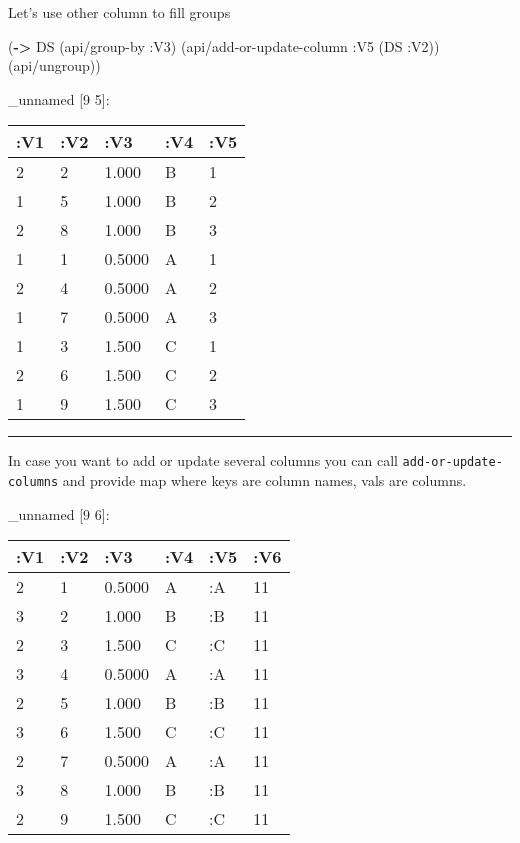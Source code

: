 \documentclass[]{article}
\newenvironment{Shaded}{\begin{snugshade}}{\end{snugshade}}
\newcommand{\KeywordTok}[1]{\textcolor[rgb]{0.13,0.29,0.53}{\textbf{#1}}}
\newcommand{\DecValTok}[1]{\textcolor[rgb]{0.00,0.00,0.81}{#1}}
\newcommand{\VariableTok}[1]{\textcolor[rgb]{0.00,0.00,0.00}{#1}}
\newcommand{\AttributeTok}[1]{\textcolor[rgb]{0.77,0.63,0.00}{#1}}
\newcommand{\NormalTok}[1]{#1}
\begin{document}
Let's use other column to fill groups

\begin{Shaded}
\begin{Highlighting}[]
\NormalTok{(}\KeywordTok{->}\NormalTok{ DS}
\NormalTok{    (api/group-by }\AttributeTok{:V3}\NormalTok{)}
\NormalTok{    (api/add-or-update-column }\AttributeTok{:V5}\NormalTok{ (DS }\AttributeTok{:V2}\NormalTok{))}
\NormalTok{    (api/ungroup))}
\end{Highlighting}
\end{Shaded}

\_unnamed {[}9 5{]}:

\begin{longtable}[]{@{}lllll@{}}
\toprule
:V1 & :V2 & :V3 & :V4 & :V5\tabularnewline
\midrule
\endhead
2 & 2 & 1.000 & B & 1\tabularnewline
1 & 5 & 1.000 & B & 2\tabularnewline
2 & 8 & 1.000 & B & 3\tabularnewline
1 & 1 & 0.5000 & A & 1\tabularnewline
2 & 4 & 0.5000 & A & 2\tabularnewline
1 & 7 & 0.5000 & A & 3\tabularnewline
1 & 3 & 1.500 & C & 1\tabularnewline
2 & 6 & 1.500 & C & 2\tabularnewline
1 & 9 & 1.500 & C & 3\tabularnewline
\bottomrule
\end{longtable}

\begin{center}\rule{0.5\linewidth}{0.5pt}\end{center}

In case you want to add or update several columns you can call
\texttt{add-or-update-columns} and provide map where keys are column
names, vals are columns.

\begin{Shaded}
\end{Shaded}

\_unnamed {[}9 6{]}:

\begin{longtable}[]{@{}llllll@{}}
\toprule
:V1 & :V2 & :V3 & :V4 & :V5 & :V6\tabularnewline
\midrule
\endhead
2 & 1 & 0.5000 & A & :A & 11\tabularnewline
3 & 2 & 1.000 & B & :B & 11\tabularnewline
2 & 3 & 1.500 & C & :C & 11\tabularnewline
3 & 4 & 0.5000 & A & :A & 11\tabularnewline
2 & 5 & 1.000 & B & :B & 11\tabularnewline
3 & 6 & 1.500 & C & :C & 11\tabularnewline
2 & 7 & 0.5000 & A & :A & 11\tabularnewline
3 & 8 & 1.000 & B & :B & 11\tabularnewline
2 & 9 & 1.500 & C & :C & 11\tabularnewline
\bottomrule
\end{longtable}
\end{document}
